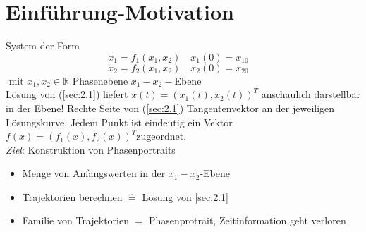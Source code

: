 \documentclass[ngerman]{tudscrreprt}
\begin{document}
\section{Einführung-Motivation}
System der Form\\
\begin{equation}
\dot x_1 =f_1(x_1,x_2) \quad x_1(0)=x_{10} \quad \tag{2.1a}
\end{equation}
\begin{equation}
\dot x_2 = f_2(x_1,x_2) \quad x_2(0)=x_{20} \quad \tag{2.1b}
\end{equation}
\label{sec:2.1}
$
\text{ mit } x_1, x_2 \in \mathbb{R}$ Phasenebene $x_1 - x_2-$Ebene
\\Lösung von (\ref{sec:2.1}) liefert $x(t) = (x_1(t), x_2(t))^T$ anschaulich darstellbar in der Ebene!
Rechte Seite von (\ref{sec:2.1}) Tangentenvektor an der jeweiligen Lösungskurve. Jedem Punkt ist eindeutig ein Vektor $f(x) = (f_1(x), f_2(x))^T$zugeordnet.\\
\textit{Ziel}: Konstruktion von Phasenportraits
\begin{itemize}
\item Menge von Anfangswerten in der $x_1 - x_2$-Ebene
\item Trajektorien berechnen $\hat{=}$ Lösung von \ref{sec:2.1}
\item Familie von Trajektorien $=$ Phasenprotrait, Zeitinformation geht verloren
\begin{figure}[H]  
  \centering
  \def\svgwidth{220pt} 
   
\end{figure} 
\end{itemize}
\end{document}
